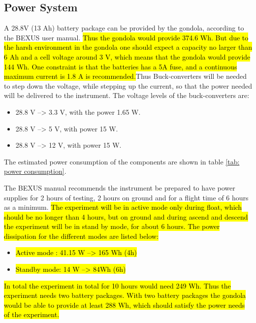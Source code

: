 \pagebreak
\subsection{Power System}

\label{sec:4.7}

A 28.8V (13 Ah) battery package can be provided by the gondola, according to the BEXUS user manual. \hl{Thus the gondola would provide 374.6 Wh. But due to the harsh environment in the gondola one should expect a capacity no larger than 6 Ah and a cell voltage around 3 V, which means that the gondola would provide 144 Wh. One constraint is that the batteries has a 5A fuse, and a continuous maximum current is 1.8 A is recommended.}Thus Buck-converters will be needed to step down the voltage, while stepping up the current, so that the power needed will be delivered to the instrument. The voltage levels of the buck-converters are:

\begin{itemize}
	\item 28.8 V --> 3.3 V, with the power 1.65 W.
	\item 28.8 V --> 5 V, with power 15 W.
	\item 28.8 V --> 12 V, with power 15 W.
\end{itemize}


The estimated power consumption of the components are shown in table \ref{tab: power consumption}.




The BEXUS manual recommends the instrument be prepared to have power supplies for 2 hours of testing, 2 hours on ground and for a flight time of 6 hours as a minimum. \hl{The experiment will be in active mode only during float, which should be no longer than 4 hours, but on ground and during ascend and descend the experiment will be in stand by mode, for about 6 hours. The power dissipation for the different modes are listed below:}


\begin{itemize}
    \item \hl{Active mode : 41.15 W --> 165 Wh (4h) }
    \item \hl{Standby mode: 14 W --> 84Wh (6h)}
\end{itemize}

\hl{In total the experiment in total for 10 hours would need 249 Wh. Thus the experiment needs two battery packages. With two battery packages the gondola would be able to provide at least 288 Wh, which should satisfy the power needs of the experiment. }



\raggedbottom
